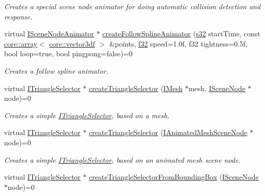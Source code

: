 \begin{DoxyCompactItemize}
\begin{DoxyCompactList}\small\item\em Creates a special scene node animator for doing automatic collision detection and response. \end{DoxyCompactList}\item 
virtual \hyperlink{classirr_1_1scene_1_1ISceneNodeAnimator}{I\+Scene\+Node\+Animator} $\ast$ \hyperlink{classirr_1_1scene_1_1ISceneManager_ab0c9d4ab88bbe2ad71623b1054a0c3ba}{create\+Follow\+Spline\+Animator} (\hyperlink{namespaceirr_ac66849b7a6ed16e30ebede579f9b47c6}{s32} start\+Time, const \hyperlink{classirr_1_1core_1_1array}{core\+::array}$<$ \hyperlink{namespaceirr_1_1core_ae6e2b2a6c552833ebbd5b7463d03586b}{core\+::vector3df} $>$ \&points, \hyperlink{namespaceirr_a0277be98d67dc26ff93b1a6a1d086b07}{f32} speed=1.\+0f, f32 tightness=0.\+5f, bool loop=true, bool pingpong=false)=0
\begin{DoxyCompactList}\small\item\em Creates a follow spline animator. \end{DoxyCompactList}\item 
virtual \hyperlink{classirr_1_1scene_1_1ITriangleSelector}{I\+Triangle\+Selector} $\ast$ \hyperlink{classirr_1_1scene_1_1ISceneManager_a266625379b1558e9be1dc062ea4e71f7}{create\+Triangle\+Selector} (\hyperlink{classirr_1_1scene_1_1IMesh}{I\+Mesh} $\ast$mesh, \hyperlink{classirr_1_1scene_1_1ISceneNode}{I\+Scene\+Node} $\ast$node)=0
\begin{DoxyCompactList}\small\item\em Creates a simple \hyperlink{classirr_1_1scene_1_1ITriangleSelector}{I\+Triangle\+Selector}, based on a mesh. \end{DoxyCompactList}\item 
virtual \hyperlink{classirr_1_1scene_1_1ITriangleSelector}{I\+Triangle\+Selector} $\ast$ \hyperlink{classirr_1_1scene_1_1ISceneManager_abc1ecc9a60abb40e7ffddbd72c077231}{create\+Triangle\+Selector} (\hyperlink{classirr_1_1scene_1_1IAnimatedMeshSceneNode}{I\+Animated\+Mesh\+Scene\+Node} $\ast$node)=0
\begin{DoxyCompactList}\small\item\em Creates a simple \hyperlink{classirr_1_1scene_1_1ITriangleSelector}{I\+Triangle\+Selector}, based on an animated mesh scene node. \end{DoxyCompactList}\item 
virtual \hyperlink{classirr_1_1scene_1_1ITriangleSelector}{I\+Triangle\+Selector} $\ast$ \hyperlink{classirr_1_1scene_1_1ISceneManager_adb717113b4203e92f2bd95c84488059c}{create\+Triangle\+Selector\+From\+Bounding\+Box} (\hyperlink{classirr_1_1scene_1_1ISceneNode}{I\+Scene\+Node} $\ast$node)=0

\end{DoxyCompactItemize}
